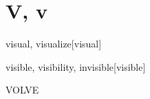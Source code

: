 \section{V, v}

\begin{word}{visual, visualize}[visual]
\end{word}

\begin{word}{visible, visibility, invisible}[visible]
\end{word}

\begin{word}{VOLVE}
\end{word}


